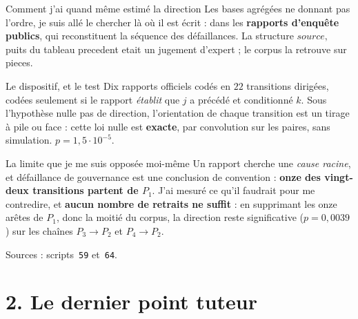 \documentclass[11pt]{beamer}
\begin{document}
\begin{frame}{Comment j'ai quand même estimé la direction}
\scriptsize
Les bases agrégées ne donnant pas l'ordre, je suis allé le chercher là où il est écrit : dans les
\textbf{rapports d'enquête publics}, qui reconstituent la séquence des défaillances.
\vspace{-0.5mm}
{\scriptsize La structure \og{}$ source, $ puits\fg{} du tableau precedent etait un
jugement d'expert ; le corpus la retrouve sur pieces.}
\begin{block}{Le dispositif, et le test}
Dix rapports officiels codés en $22$ transitions dirigées, codées seulement si le rapport
\emph{établit} que $j$ a précédé et conditionné $k$. Sous l'hypothèse nulle \og{}pas de
direction\fg{},
l'orientation de chaque transition est un tirage à pile ou face : cette loi nulle est
\textbf{exacte}, par convolution sur les paires, sans simulation. $p = 1{,}5\cdot10^{-5}$.
\end{block}
\vspace{-1mm}
\begin{block}{La limite que je me suis opposée moi-même}
Un rapport cherche une \emph{cause racine}, et \og{}défaillance de gouvernance\fg{} est une
conclusion de convention : \textbf{onze des vingt-deux transitions partent de $P_1$}. J'ai mesuré
ce qu'il faudrait pour me contredire, et \textbf{aucun nombre de retraits ne suffit} : en
supprimant les onze arêtes de $P_1$, donc la moitié du corpus, la direction reste significative
($p = 0{,}0039$) sur les chaînes $P_3 \to P_2$ et $P_4 \to P_2$.
\end{block}
\vspace{-2.5mm}
{\scriptsize Sources : scripts~\texttt{59} et~\texttt{64}.}
\end{frame}

\section*{2. Le dernier point tuteur}
\end{document}
